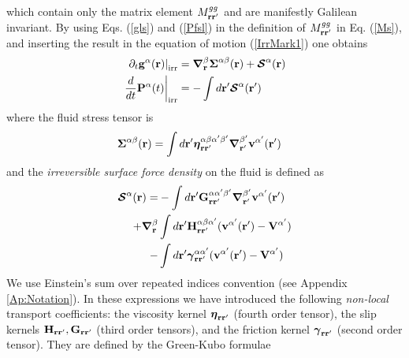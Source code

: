 \documentclass[b5paper,openright,11pt]{book}
\begin{document}
which contain only  the matrix element $M^{gg}_{{\bf  r}{\bf r}'}$ and are
manifestly  Galilean   invariant.   By  using  Eqs.   (\ref{gls})  and
(\ref{Pfsl}) {in} the  definition  of $M^{gg}_{{\bf  r}{\bf r}'}$  in
Eq. (\ref{Ms}),  and inserting  the result in  the equation  of motion
(\ref{IrrMark1}) one obtains
\begin{align}
\left.  \partial_t{\bf g}^\alpha({\bf r})\right|_{\rm irr}&= \boldsymbol{\nabla}_{\bf r}^{\beta}\boldsymbol{\Sigma}^{\alpha\beta}({\bf r}) +\boldsymbol{{\cal S}}^\alpha({\bf r}) 
\nonumber\\
\left.\frac{d}{dt}{\bf P}^\alpha(t)\right|_{\rm irr}&=-\int d{\bf r}'   \boldsymbol{{\cal S}}^\alpha({\bf r}')
\label{Irr}
\end{align}
where the fluid stress tensor is
\begin{align}
  \boldsymbol{\Sigma}^{\alpha\beta}({\bf r})&=
\int d{\bf r}'
\boldsymbol{\eta}^{\alpha\beta\alpha'\beta'}_{{\bf r}{\bf r}'}
\boldsymbol{\nabla}_{{\bf r}'}^{\beta'}{\bf v}^{\alpha'}({\bf r}')
\label{FluidStress}
\end{align}
and the \textit{irreversible surface force density} on the fluid is defined as
\begin{align}
\boldsymbol{{\cal S}}^\alpha({\bf r})=&
-\int d{\bf r}'{\bf G}^{\alpha\alpha'\beta'}_{{\bf r}{\bf r}'}
\boldsymbol{\nabla}_{{\bf r}'}^{\beta'} {\bf v}^{\alpha'}({\bf r}')
\nonumber\\
+\boldsymbol{\nabla}_{{\bf r}}^{\beta}&\int d{\bf r}'{\bf H}^{\alpha\beta\alpha'}_{{\bf r}{\bf r}'}
( {\bf v}^{\alpha'}({\bf r}')-{\bf V}^{\alpha'})
\nonumber\\
-&\int d{\bf r}'
\boldsymbol{\gamma}^{\alpha\alpha'}_{{\bf r}{\bf r}'}( {\bf v}^{\alpha'}({\bf r}')
-{\bf V}^{\alpha'})
\label{Irreversibleforces}
\end{align}
We use Einstein's sum over repeated indices convention (see Appendix \ref{Ap:Notation}).
In   these    expressions   we    have   introduced    the   following
\textit{non-local}  transport   coefficients:  the   viscosity  kernel
$\boldsymbol{\eta}_{{\bf r}{\bf r}'}$ (fourth  order tensor), the slip
kernels ${\bf  H}_{{\bf r}{\bf r}'},{\bf G}_{{\bf  r}{\bf r}'}$ (third
order  tensors), and  the  friction kernel  $\boldsymbol{\gamma}_{{\bf
    r}{\bf  r}'}$ (second  order  tensor).  They  are  defined by  the
Green-Kubo formulae
\end{document}
